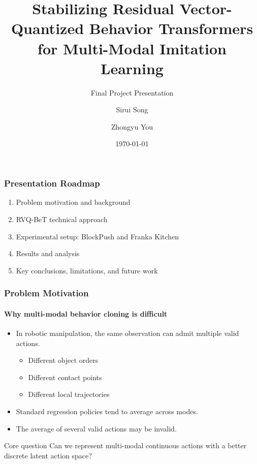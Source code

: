 \documentclass[aspectratio=169]{ctexbeamer}
\title{Stabilizing Residual Vector-Quantized Behavior Transformers for Multi-Modal Imitation Learning}
\subtitle{Final Project Presentation}
\author{Sirui Song \and Zhongyu You}
\institute[SJTU]{Shanghai Jiao Tong University}
\date{\today}
\begin{document}
\maketitle

\begin{frame}
  \frametitle{Presentation Roadmap}
  \begin{enumerate}
    \item Problem motivation and background
    \item RVQ-BeT technical approach
    \item Experimental setup: BlockPush and Franka Kitchen
    \item Results and analysis
    \item Key conclusions, limitations, and future work
  \end{enumerate}
\end{frame}

\begin{frame}
  \frametitle{Problem Motivation}
  \framesubtitle{Why multi-modal behavior cloning is difficult}
  \begin{itemize}
    \item In robotic manipulation, the same observation can admit multiple valid actions.
    \begin{itemize}
      \item Different object orders
      \item Different contact points
      \item Different local trajectories
    \end{itemize}
    \item Standard regression policies tend to average across modes.
    \item The average of several valid actions may be invalid.
  \end{itemize}
  \vspace{0.5em}
  \begin{block}{Core question}
    Can we represent multi-modal continuous actions with a better discrete latent action space?
  \end{block}
\end{frame}
\end{document}
